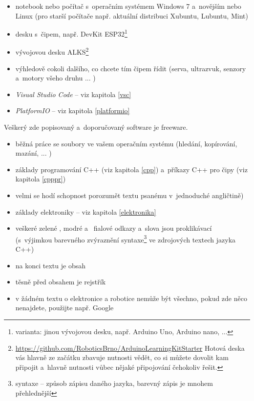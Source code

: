 \begin{itemize} %
\item  notebook nebo počítač s~operačním systémem Windows 7 a~novějším nebo Linux (pro starší počítače např. aktuální distribuci Xubuntu, Lubuntu, Mint)
\item  desku s~čipem, např. DevKit ESP32\footnote{varianta: jinou vývojovou desku, např. Arduino Uno, Arduino nano, ...  }
\item  vývojovou desku ALKS\footnote{\url{https://github.com/RoboticsBrno/ArduinoLearningKitStarter} \hfil {} 
Hotová deska vás hlavně ze začátku zbavuje nutnosti vědět, co si můžete dovolit kam připojit a~hlavně nutnosti vůbec nějaké připojování čehokoliv řešit. }
\item výhledově cokoli dalšího, co chcete tím čipem řídit (serva, ultrazvuk, senzory a~motory všeho druhu ... )
\end{itemize}

\begin{itemize} %
\item  {\it Visual Studio Code} -- viz kapitola \ref{vsc}
\item  {\it PlatformIO }-- viz kapitola \ref{platformio}
\end{itemize}
Veškerý zde popisovaný a~doporučovaný software je freeware.

\begin{itemize} %
\item  běžná práce se soubory ve vašem operačním systému (hledání, kopírování, mazání, ... )
\item  základy programování C++ (viz kapitola \ref{cpp}) a~příkazy C++ pro čipy (viz kapitola \ref{cpppr})
\item  velmi se hodí schopnost porozumět textu psanému v~jednoduché angličtině)
\item  základy elektroniky -- viz kapitola \ref{elektronika}
\end{itemize}

\begin{itemize} %
\item veškeré \color{mygreen} zelené\color{black} , \color{blue} modré \color{black} a~\color{magenta} fialové \color{black} odkazy a~slova jsou proklikávací (s~výjimkou barevného zvýraznění syntaxe\footnote{syntaxe -- způsob zápisu daného jazyka, barevný zápis je mnohem přehlednější} ve zdrojových textech jazyka C++)
\item na konci textu je obsah 
\item těsně před obsahem je rejstřík
\item v žádném textu o elektronice a robotice nemůže být všechno, pokud zde něco nenajdete, použijte např. Google
\end{itemize}


